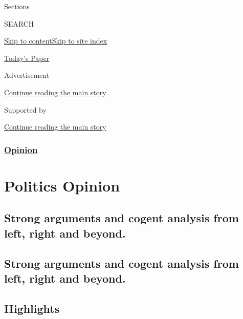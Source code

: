 Sections

SEARCH

\protect\hyperlink{site-content}{Skip to
content}\protect\hyperlink{site-index}{Skip to site index}

\href{https://myaccount.nytimes3xbfgragh.onion/auth/login?response_type=cookie\&client_id=vi}{}

\href{https://www.nytimes3xbfgragh.onion/section/todayspaper}{Today's
Paper}

Advertisement

\protect\hyperlink{after-top}{Continue reading the main story}

Supported by

\protect\hyperlink{after-sponsor}{Continue reading the main story}

\hypertarget{opinion}{%
\subsubsection{\texorpdfstring{\href{/section/opinion}{Opinion}}{Opinion}}\label{opinion}}

\hypertarget{politics--opinion}{%
\section{Politics \textbar{} Opinion}\label{politics--opinion}}

\hypertarget{strong-arguments-and-cogent-analysis-from-left-right-and-beyond}{%
\subsection{Strong arguments and cogent analysis from left, right and
beyond.}\label{strong-arguments-and-cogent-analysis-from-left-right-and-beyond}}

\hypertarget{strong-arguments-and-cogent-analysis-from-left-right-and-beyond-1}{%
\subsection{Strong arguments and cogent analysis from left, right and
beyond.}\label{strong-arguments-and-cogent-analysis-from-left-right-and-beyond-1}}

\hypertarget{highlights}{%
\subsection{Highlights}\label{highlights}}

